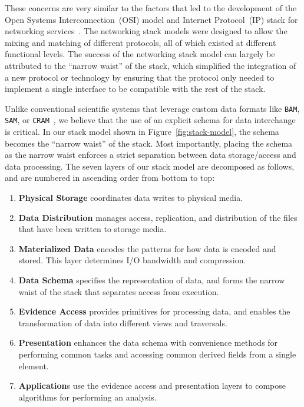 \documentclass{sig-alternate}
\begin{document}
These concerns are very similar to the factors that led to the development of the Open Systems
Interconnection~(OSI) model and Internet Protocol~(IP) stack for networking
services~\cite{zimmermann80}. The networking stack models were designed to allow the mixing and
matching of different protocols, all of which existed at different functional levels. The success of the
networking stack model can largely be attributed to the ``narrow waist'' of the stack, which simplified the
integration of a new protocol or technology by ensuring that the protocol only needed to implement a
single interface to be compatible with the rest of the stack.

Unlike conventional scientific systems that leverage custom data formats like \texttt{BAM}, \texttt{SAM},
or \texttt{CRAM}~\cite{fritz11, li09}, we believe that the use of an explicit schema for data interchange is critical.
In our stack model shown in Figure~\ref{fig:stack-model}, the schema becomes the ``narrow waist''
of the stack. Most importantly, placing the schema as the narrow waist enforces a strict separation
between data storage/access and data processing. The seven layers of our stack model
are decomposed as follows, and are numbered in ascending order from bottom to top:

\begin{enumerate}
\item {\bf Physical Storage} coordinates data writes to physical media.
\item {\bf Data Distribution} manages access, replication, and distribution of the files that have
been written to storage media.
\item {\bf Materialized Data} encodes the patterns for how data is encoded and stored. This
layer determines I/O bandwidth and compression.
\item {\bf Data Schema} specifies the representation of data, and forms the narrow waist of
the stack that separates access from execution.
\item {\bf Evidence Access} provides primitives for processing data, and enables the transformation of
data into different views and traversals.
\item {\bf Presentation} enhances the data schema with convenience methods for performing
common tasks and accessing common derived fields from a single element.
\item {\bf Application}s use the evidence access and presentation layers to compose
algorithms for performing an analysis.
\end{enumerate}
\end{document}
